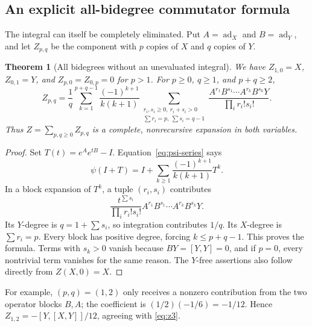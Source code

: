 \documentclass[11pt]{article}
\newtheorem{theorem}{Theorem}[section]
\theoremstyle{definition}
\theoremstyle{remark}
\newcommand{\ad}{\operatorname{ad}}
\numberwithin{equation}{section}
\begin{document}
\subsection{An explicit all-bidegree commutator formula}
The integral can itself be completely eliminated. Put $A=\ad_X$ and $B=\ad_Y$, and let $Z_{p,q}$ be the component with $p$ copies of $X$ and $q$ copies of $Y$.
\begin{theorem}[All bidegrees without an unevaluated integral]\label{thm:bidegree}
We have $Z_{1,0}=X$, $Z_{0,1}=Y$, and $Z_{p,0}=Z_{0,p}=0$ for $p>1$. For $p\geq0$, $q\geq1$, and $p+q\geq2$,
\begin{equation}\label{eq:bidegree}
 \boxed{
 Z_{p,q}=\frac1q\sum_{k=1}^{p+q-1}\frac{(-1)^{k+1}}{k(k+1)}
 \sum_{\substack{r_i,s_i\geq0,\ r_i+s_i>0\\
                   \sum r_i=p,\ \sum s_i=q-1}}
 \frac{A^{r_1}B^{s_1}\cdots A^{r_k}B^{s_k}Y}
      {\prod_i r_i!s_i!}.}
\end{equation}
Thus $Z=\sum_{p,q\geq0}Z_{p,q}$ is a complete, nonrecursive expansion in both variables.
\end{theorem}
\begin{proof}
Set $T(t)=e^Ae^{tB}-I$. Equation~\eqref{eq:psi-series} says
\[
 \psi(I+T)=I+\sum_{k\geq1}\frac{(-1)^{k+1}}{k(k+1)}T^k.
\]
In a block expansion of $T^k$, a tuple $(r_i,s_i)$ contributes
\[
 \frac{t^{\sum s_i}}{\prod_i r_i!s_i!}
 A^{r_1}B^{s_1}\cdots A^{r_k}B^{s_k}Y.
\]
Its $Y$-degree is $q=1+\sum s_i$, so integration contributes $1/q$. Its $X$-degree is $\sum r_i=p$. Every block has positive degree, forcing $k\leq p+q-1$. This proves the formula. Terms with $s_k>0$ vanish because $BY=[Y,Y]=0$, and if $p=0$, every nontrivial term vanishes for the same reason. The $Y$-free assertions also follow directly from $Z(X,0)=X$.
\end{proof}
For example, $(p,q)=(1,2)$ only receives a nonzero contribution from the two operator blocks $B,A$; the coefficient is $(1/2)(-1/6)=-1/12$. Hence $Z_{1,2}=-[Y,[X,Y]]/12$, agreeing with \eqref{eq:z3}.
\end{document}
